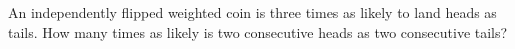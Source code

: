 An independently flipped weighted coin is three times as likely to land heads as tails. How many times as likely is two consecutive heads as two consecutive tails?
